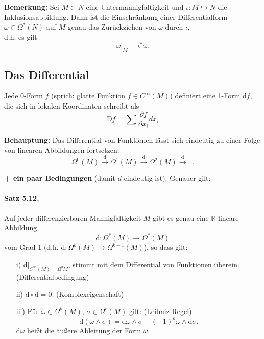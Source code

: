 \documentclass[fleqn, 12pt, letterpaper]{article}
\newcommand{\deldel}[2]{\frac{\partial #1}{\partial #2}}
\begin{document}
\textbf{Bemerkung:} Sei \( M \subset N \) eine Untermannigfaltigkeit und \( \iota : M \hookrightarrow N \) die Inklusionsabbildung. Dann ist die Einschränkung einer Differentialform \( \omega \in \Omega^*(N) \) auf \( M \) genau das Zurückziehen von \( \omega \) durch \( \iota \),\\
d.h. es gilt 
\[
\omega|_M = \iota^* \omega.
\]
\subsection{Das Differential}

Jede 0-Form \( f \) (sprich: glatte Funktion \( f \in C^\infty(M) \)) definiert eine 1-Form \( \mathrm{d}f \), die sich in lokalen Koordinaten schreibt als
\[
\mathrm{D}f = \sum\deldel{f}{x_i}dx_i
\]

\textbf{Behauptung:} Das Differential von Funktionen lässt sich eindeutig zu einer Folge von linearen Abbildungen fortsetzen:
\[
\Omega^0(M) \xrightarrow{\mathrm{d}} \Omega^1(M) \xrightarrow{\mathrm{d}} \Omega^2(M) \xrightarrow{\mathrm{d}} \dots
\]

\textbf{+ ein paar Bedingungen} (damit $d$ eindeutig ist). Genauer gilt:

\paragraph{Satz 5.12.}
Auf jeder differenzierbaren Mannigfaltigkeit \( M \) gibt es genau eine \( \mathbb{R} \)-lineare Abbildung
\[
\mathrm{d} : \Omega^*(M) \longrightarrow \Omega^*(M)
\]
vom Grad 1 (d.h. \( \mathrm{d} : \Omega^k(M) \to \Omega^{k+1}(M) \)), so dass gilt:

\begin{itemize}
    \item[i)] \( \mathrm{d}|_{C^\infty(M)=\Omega^0M} \), stimmt mit dem Differential von Funktionen überein. (Differentialbedingung)
    \item[ii)] \( \mathrm{d} \circ \mathrm{d} = 0 \). (Komplexeigenschaft)
    \item[iii)] Für \( \omega \in \Omega^k(M) \), \( \sigma \in \Omega^\ell(M) \) gilt: (Leibniz-Regel)
    \[
    \mathrm{d}(\omega \wedge \sigma) = \mathrm{d}\omega \wedge \sigma + (-1)^k \omega \wedge \mathrm{d}\sigma.
    \]
    \( \mathrm{d}\omega \) heißt die \underline{äußere Ableitung} der Form \( \omega \).
\end{itemize}
\end{document}
